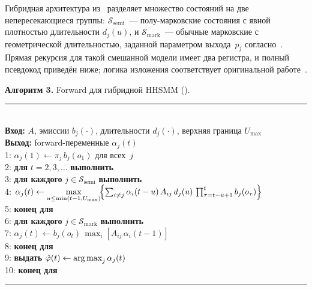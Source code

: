 %
Гибридная архитектура из~ разделяет множество
состояний на две непересекающиеся группы:
$\mathcal{S}_{\text{semi}}$~--- полу-марковские состояния с явной
плотностью длительности $d_j(u)$, и $\mathcal{S}_{\text{mark}}$~---
обычные марковские с геометрической длительностью, заданной
параметром выхода~$p_j$ согласно~.
Прямая рекурсия для такой смешанной модели имеет два регистра, и
полный псевдокод приведён ниже; логика изложения соответствует
оригинальной работе~\cite[\S~IV]{Cont2010}.

\par\addvspace{2pt}
{\centering
\begin{minipage}{0.97\linewidth}
\footnotesize
\textbf{Алгоритм 3.} Forward для гибридной HHSMM
(\cite[уравн.~3--4]{Cont2010}). \\[1pt]
\rule{\linewidth}{0.4pt}\vspace{1pt}\\
\textbf{Вход:} $A$, эмиссии $b_j(\cdot)$, длительности
$d_j(\cdot)$, верхняя граница $U_{\max}$ \\
\textbf{Выход:} forward-переменные $\alpha_j(t)$ \\
1: $\alpha_j(1) \gets \pi_j\,b_j(o_1)$ для всех~$j$ \\
2: \textbf{для} $t = 2, 3, \dots$ \textbf{выполнить} \\
3: \quad \textbf{для каждого} $j \in \mathcal{S}_{\text{semi}}$
   \textbf{выполнить} \\
4: \quad\quad $\alpha_j(t) \gets \max\limits_{u\le \min(t-1, U_{\max})}\!
   \Bigl\{\sum_{i\ne j}\alpha_i(t-u)\,A_{ij}\,d_j(u)\,
   \prod_{\tau=t-u+1}^{t} b_j(o_\tau)\Bigr\}$ \\
5: \quad \textbf{конец для} \\
6: \quad \textbf{для каждого} $j \in \mathcal{S}_{\text{mark}}$
   \textbf{выполнить} \\
7: \quad\quad $\alpha_j(t) \gets b_j(o_t)\,\max_i [A_{ij}\,
   \alpha_i(t-1)]$ \\
8: \quad \textbf{конец для} \\
9: \quad \textbf{выдать} $\hat\varphi(t) \gets
   \operatorname*{arg\,max}_j \alpha_j(t)$ \\
10: \textbf{конец для} \\
\rule{\linewidth}{0.4pt}
\end{minipage}\par}
\addvspace{4pt}

